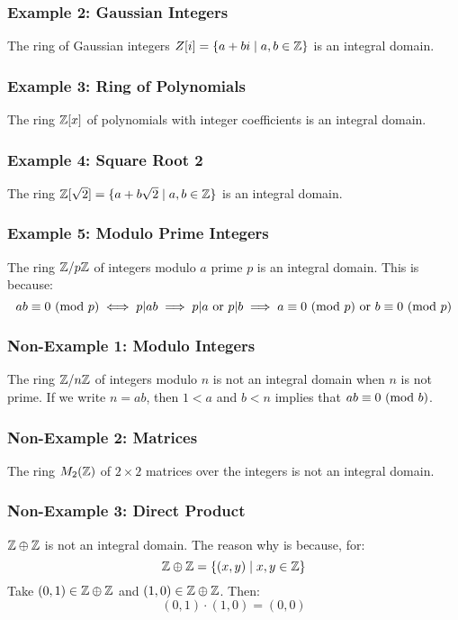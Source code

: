 \documentclass[letterpaper]{article}
\begin{document}
\subsubsection{Example 2: Gaussian Integers}
The ring of Gaussian integers $Z[i] = \{a + bi \mid a, b \in \mathbb{Z}\}$ is an integral domain. 

\subsubsection{Example 3: Ring of Polynomials}
The ring $\mathbb{Z}[x]$ of polynomials with integer coefficients is an integral domain. 

\subsubsection{Example 4: Square Root 2}
The ring $\mathbb{Z}[\sqrt{2}] = \{a + b\sqrt{2} \mid a, b \in \mathbb{Z}\}$ is an integral domain. 

\subsubsection{Example 5: Modulo Prime Integers}
The ring $\mathbb{Z} / p\mathbb{Z}$ of integers modulo $a$ prime $p$ is an integral domain. This is because:
\[ab \equiv 0 \ (\mathrm{mod}\ p) \iff p | ab \implies p | a \text{ or } p | b \implies a \equiv 0 \ (\mathrm{mod}\ p) \text{ or } b \equiv 0 \ (\mathrm{mod}\ p)\] 

\subsubsection{Non-Example 1: Modulo Integers}
The ring $\mathbb{Z} / n\mathbb{Z}$ of integers modulo $n$ is not an integral domain when $n$ is not prime. If we write $n = ab$, then $1 < a$ and $b < n$ implies that $ab \equiv 0 \ (\mathrm{mod}\ b)$. 

\subsubsection{Non-Example 2: Matrices}
The ring $M_{2}(\mathbb{Z})$ of $2 \times 2$ matrices over the integers is not an integral domain. 

\subsubsection{Non-Example 3: Direct Product}
$\mathbb{Z} \oplus \mathbb{Z}$ is not an integral domain. The reason why is because, for:
\[\mathbb{Z} \oplus \mathbb{Z} = \{(x, y) \mid x, y \in \mathbb{Z}\}\]
Take $(0, 1) \in \mathbb{Z} \oplus \mathbb{Z}$ and $(1, 0) \in \mathbb{Z} \oplus \mathbb{Z}$. Then:
\[(0, 1) \cdot (1, 0) = (0, 0)\]
\end{document}
